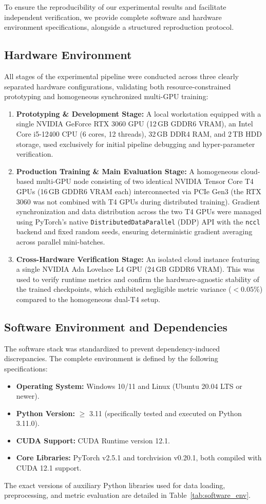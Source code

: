 \documentclass[fleqn,10pt]{wlscirep}
\begin{document}
To ensure the reproducibility of our experimental results and facilitate independent verification, we provide complete software and hardware environment specifications, alongside a structured reproduction protocol.

\subsection*{Hardware Environment}
All stages of the experimental pipeline were conducted across three clearly separated hardware configurations, validating both resource-constrained prototyping and homogeneous synchronized multi-GPU training:
\begin{enumerate}
    \item \textbf{Prototyping \& Development Stage:} A local workstation equipped with a single NVIDIA GeForce RTX 3060 GPU (12\,GB GDDR6 VRAM), an Intel Core i5-12400 CPU (6 cores, 12 threads), 32\,GB DDR4 RAM, and 2\,TB HDD storage, used exclusively for initial pipeline debugging and hyper-parameter verification.
    \item \textbf{Production Training \& Main Evaluation Stage:} A homogeneous cloud-based multi-GPU node consisting of two identical NVIDIA Tensor Core T4 GPUs (16\,GB GDDR6 VRAM each) interconnected via PCIe Gen3 (the RTX 3060 was not combined with T4 GPUs during distributed training). Gradient synchronization and data distribution across the two T4 GPUs were managed using PyTorch's native \texttt{DistributedDataParallel} (DDP) API with the \texttt{nccl} backend and fixed random seeds, ensuring deterministic gradient averaging across parallel mini-batches.
    \item \textbf{Cross-Hardware Verification Stage:} An isolated cloud instance featuring a single NVIDIA Ada Lovelace L4 GPU (24\,GB GDDR6 VRAM). This was used to verify runtime metrics and confirm the hardware-agnostic stability of the trained checkpoints, which exhibited negligible metric variance ($< 0.05\%$) compared to the homogeneous dual-T4 setup.
\end{enumerate}

\subsection*{Software Environment and Dependencies}
The software stack was standardized to prevent dependency-induced discrepancies. The complete environment is defined by the following specifications:
\begin{itemize}
    \item \textbf{Operating System:} Windows 10/11 and Linux (Ubuntu 20.04 LTS or newer).
    \item \textbf{Python Version:} $\geq$ 3.11 (specifically tested and executed on Python 3.11.0).
    \item \textbf{CUDA Support:} CUDA Runtime version 12.1.
    \item \textbf{Core Libraries:} PyTorch v2.5.1 and torchvision v0.20.1, both compiled with CUDA 12.1 support.
\end{itemize}
The exact versions of auxiliary Python libraries used for data loading, preprocessing, and metric evaluation are detailed in Table~\ref{tab:software_env}.
\end{document}
